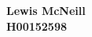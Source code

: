 \documentclass[11pt,fleqn,a4wide]{article}
\date{}
\begin{document}
     
\maketitle   

\begin{center}
\huge{
\textbf{
Lewis McNeill\\
\bigskip
H00152598
}
}
\end{center}
\end{document}
